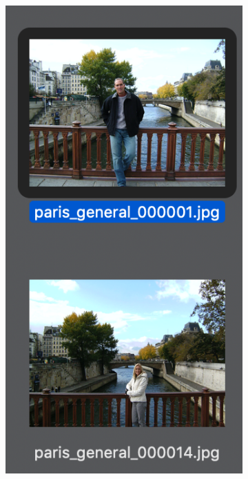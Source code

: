 \documentclass[12pt]{article}
\begin{document}
\begin{figure}[H]
	\centering
	\begin{subfigure}[b]{.33\textwidth}
		\includegraphics[width=.75\textwidth]{images/correct_match_1.png}
	\end{subfigure}%
	~
	\begin{subfigure}[b]{.33\textwidth}

\end{subfigure}
\end{figure}
\end{document}
